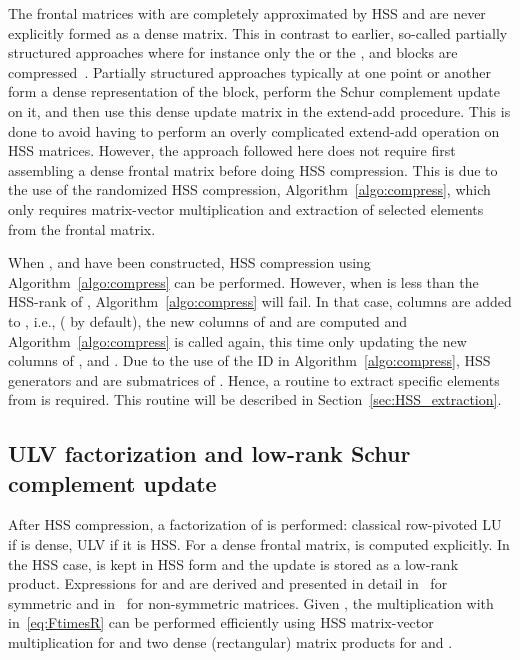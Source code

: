 \documentclass{article}
\begin{document}
The frontal matrices  with 
are completely approximated by HSS and are never explicitly formed as
a dense matrix. This in contrast to earlier, so-called partially
structured approaches where for instance only the  or the
,  and  blocks are
compressed~\cite{wang2014parallel}. Partially structured approaches
typically at one point or another form a dense representation of the
 block, perform the Schur complement update on it, and then
use this dense update matrix in the extend-add procedure. This is done
to avoid having to perform an overly complicated extend-add operation
on HSS matrices. However, the approach followed here does not require
first assembling a dense frontal matrix before doing HSS
compression. This is due to the use of the randomized HSS compression,
Algorithm~\ref{algo:compress}, which only requires matrix-vector
multiplication and extraction of selected elements from the frontal
matrix.

When ,  and  have been constructed, HSS compression
using Algorithm~\ref{algo:compress} can be performed. However, when
 is less than the HSS-rank of ,
Algorithm~\ref{algo:compress} will fail. In that case, columns are
added to , i.e.,  ( by
default), the new columns of  and  are computed and
Algorithm~\ref{algo:compress} is called again, this time only updating
the new columns of ,  and . Due to the use of the
ID in Algorithm~\ref{algo:compress}, HSS generators  and
 are submatrices of . Hence, a routine
to extract specific elements from  is required. This
routine will be described in Section~\ref{sec:HSS_extraction}.

\subsection{ULV factorization and low-rank Schur complement update}\label{sec:HSSfact_lowrank_Schur}
After HSS compression, a factorization of  is performed:
classical row-pivoted LU if  is dense, ULV if it is
HSS.
For a dense frontal matrix,  is computed explicitly.  In the HSS case,
 is kept in HSS form and the update  is stored as a
low-rank product. Expressions for  and  are
derived and presented in detail in~\cite{xia2013randomized} for
symmetric and in~\cite{xia2012superfast} for non-symmetric matrices.
Given , the
multiplication with  in~\eqref{eq:FtimesR} can be
performed efficiently using HSS matrix-vector multiplication
for  and two dense (rectangular) matrix products for
 and .
\end{document}

